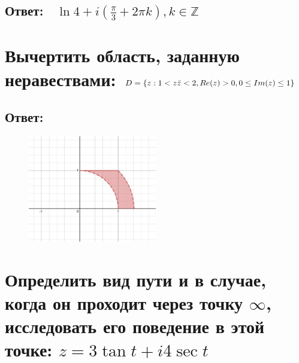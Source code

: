 \documentclass{article}
\begin{document}
	\subsection{Ответ:$\quad\ln 4 + i\left(\frac{\pi}{3} + 2\pi k\right), k \in \mathbb{Z}$}
 
        \section{Вычертить область, заданную неравествами: $\\D = \{z : 1 < z\bar{z} < 2, Re(z) > 0, 0 \le Im(z) \le 1 \}$}
	\subsection{Ответ:}
        \begin{figure}[h]
            \centering
            \includegraphics[width=0.5\textwidth]{gr_1.jpg}
            \label{fig:my_label}
        \end{figure}

        \section{Определить вид пути и в случае, когда он проходит через точку $\infty$, исследовать его поведение в этой точке: $z = 3\tan{t}+i4\sec{t}$}
\end{document}
